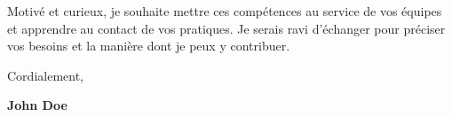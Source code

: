 \documentclass[11pt,a4paper]{article}
\begin{document}
\par

Motivé et curieux, je souhaite mettre ces compétences au service de vos équipes et apprendre au contact de vos pratiques. Je serais ravi d’échanger pour préciser vos besoins et la manière dont je peux y contribuer.

\par


\vspace{0.7cm}


Cordialement,


\vspace{0.5cm}

\textbf{John Doe}
\end{document}
